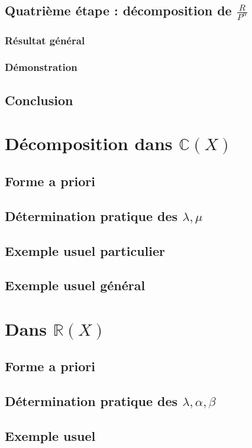 \documentclass[12pt,a4paper,french]{book}
\begin{document}
		\subsection{Quatrième étape : décomposition de $\frac{R}{P^{\alpha}}$}
			\subsubsection{Résultat général}
			\subsubsection{Démonstration}
		\subsection{Conclusion}
	\section{Décomposition dans $\mathbb{C}(X)$}
		\subsection{Forme a priori}
		\subsection{Détermination pratique des $\lambda,\mu$}
		\subsection{Exemple usuel particulier}
		\subsection{Exemple usuel général}
	\section{Dans $\mathbb{R}(X)$}
		\subsection{Forme a priori}
		\subsection{Détermination pratique des $\lambda,\alpha,\beta$}
		\subsection{Exemple usuel}
\end{document}
